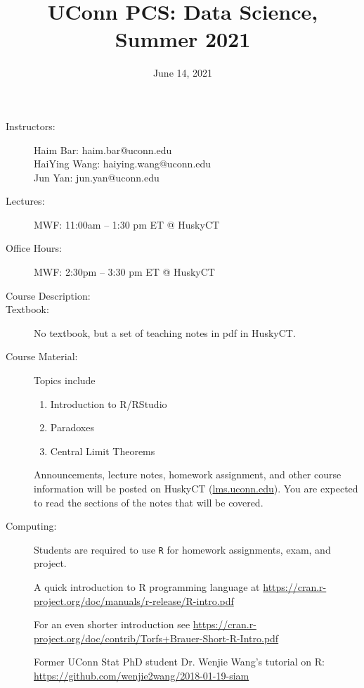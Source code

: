 \documentclass[11pt]{article}
\begin{document}
\title{UConn PCS: Data Science, Summer 2021}
\date{June 14, 2021}
\maketitle

\thispagestyle{fancy}


\begin{description}
\item[Instructors:] \hspace{0pt}

  Haim Bar: haim.bar@uconn.edu\\
  HaiYing Wang: haiying.wang@uconn.edu\\
  Jun Yan: jun.yan@uconn.edu

\item[Lectures:] 
  MWF: 11:00am -- 1:30 pm ET @ HuskyCT

\item[Office Hours:] 
  MWF: 2:30pm -- 3:30 pm ET @ HuskyCT


\item[Course Description:]


\item[Textbook:] 
  No textbook, but a set of teaching notes in pdf in HuskyCT.
  
\item[Course Material:]

Topics include
\begin{enumerate}[noitemsep]
\item
  Introduction to R/RStudio
\item
  Paradoxes
\item
  Central Limit Theorems
\end{enumerate}

Announcements, lecture notes, homework assignment, and other course
information will be posted on HuskyCT (\url{lms.uconn.edu}). 
You are expected to read the sections of the notes that will be covered.

\item[Computing:]
  Students are required to use \texttt{R}
  for homework assignments, exam, and project.

A quick introduction to R programming language at
\url{https://cran.r-project.org/doc/manuals/r-release/R-intro.pdf}

For an even shorter introduction see
\url{https://cran.r-project.org/doc/contrib/Torfs+Brauer-Short-R-Intro.pdf}

Former UConn Stat PhD student Dr. Wenjie Wang's tutorial on R:
\url{https://github.com/wenjie2wang/2018-01-19-siam}


\end{description}
\end{document}
